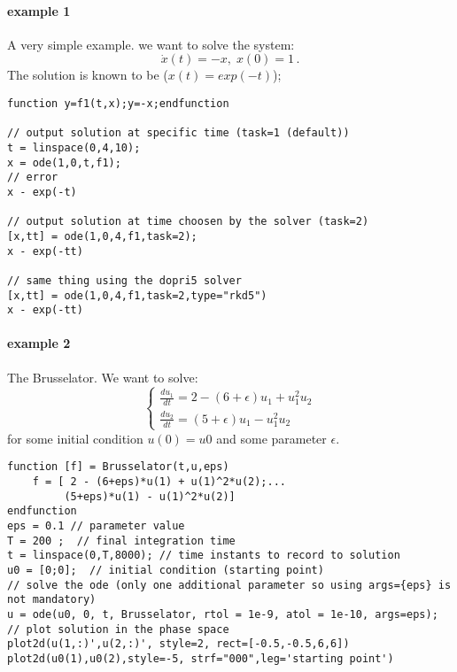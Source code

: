 \begin{examples}
  
\paragraph{example 1} A very simple example. we want to solve the system:
$$
  \dot{x}(t) = - x, \; x(0) = 1\,.
$$ 
The solution is known to be ($x(t) = exp(-t)$);
\begin{Verbatim}
function y=f1(t,x);y=-x;endfunction

// output solution at specific time (task=1 (default))
t = linspace(0,4,10);
x = ode(1,0,t,f1);
// error
x - exp(-t)

// output solution at time choosen by the solver (task=2)
[x,tt] = ode(1,0,4,f1,task=2);
x - exp(-tt)

// same thing using the dopri5 solver
[x,tt] = ode(1,0,4,f1,task=2,type="rkd5")
x - exp(-tt)
\end{Verbatim}
  
  
\paragraph{example 2} The Brusselator. We want to solve:
$$
\left\{
\begin{array}{l}
\frac{du_1}{dt} = 2 - (6 + \epsilon) u_1 + u_1^2 u_2 \\
\frac{du_2}{dt} = (5 + \epsilon) u_1 - u_1^2 u_2
\end{array}
\right.
$$
for some initial condition $u(0) = u0$ and some parameter $\epsilon$.
\begin{Verbatim}
function [f] = Brusselator(t,u,eps)
    f = [ 2 - (6+eps)*u(1) + u(1)^2*u(2);...
         (5+eps)*u(1) - u(1)^2*u(2)]
endfunction
eps = 0.1 // parameter value
T = 200 ;  // final integration time
t = linspace(0,T,8000); // time instants to record to solution
u0 = [0;0];  // initial condition (starting point)
// solve the ode (only one additional parameter so using args={eps} is not mandatory)
u = ode(u0, 0, t, Brusselator, rtol = 1e-9, atol = 1e-10, args=eps);
// plot solution in the phase space
plot2d(u(1,:)',u(2,:)', style=2, rect=[-0.5,-0.5,6,6])
plot2d(u0(1),u0(2),style=-5, strf="000",leg='starting point')
\end{Verbatim}
  
  

\end{examples}
